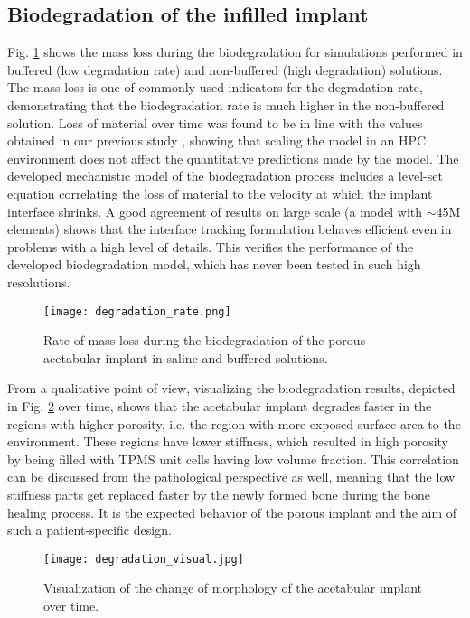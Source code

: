 \subsection{Biodegradation of the infilled implant}

Fig. \ref{fig:cup_degradation_rate} shows the mass loss during the biodegradation for simulations performed in buffered (low degradation rate) and non-buffered (high degradation) solutions. The mass loss is one of commonly-used indicators for the degradation rate, demonstrating that the biodegradation rate is much higher in the non-buffered solution. Loss of material over time was found to be in line with the values obtained in our previous study \cite{Barzegari2021}, showing that scaling the model in an HPC environment does not affect the quantitative predictions made by the model. The developed mechanistic model of the biodegradation process includes a level-set equation correlating the loss of material to the velocity at which the implant interface shrinks. A good agreement of results on large scale (a model with $\sim$45M elements) shows that the interface tracking formulation behaves efficient even in problems with a high level of details. This verifies the performance of the developed biodegradation model, which has never been tested in such high resolutions.

\begin{figure}[h]
\centering
\medskip
\texttt{[image: degradation\_rate.png]}
\caption[Biodegradation rate for the acetabular implant]{Rate of mass loss during the biodegradation of the porous acetabular implant in saline and buffered solutions.} \label{fig:cup_degradation_rate}
\end{figure}

From a qualitative point of view, visualizing the biodegradation results, depicted in Fig. \ref{fig:cup_degradation_visual} over time, shows that the acetabular implant degrades faster in the regions with higher porosity, i.e. the region with more exposed surface area to the environment. These regions have lower stiffness, which resulted in high porosity by being filled with TPMS unit cells having low volume fraction. This correlation can be discussed from the pathological perspective as well, meaning that the low stiffness parts get replaced faster by the newly formed bone during the bone healing process. It is the expected behavior of the porous implant and the aim of such a patient-specific design.

\begin{figure}[h]
\centering
\medskip
\texttt{[image: degradation\_visual.jpg]}
\caption[Visualization of the change of morphology of the acetabular implant]{Visualization of the change of morphology of the acetabular implant over time.} \label{fig:cup_degradation_visual}
\end{figure}

